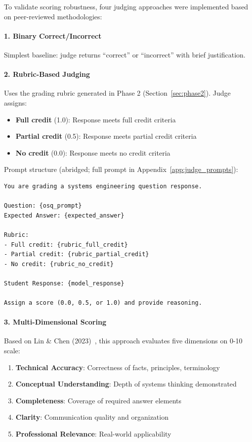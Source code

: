 To validate scoring robustness, four judging approaches were implemented based on peer-reviewed methodologies:

\paragraph{1. Binary Correct/Incorrect}
Simplest baseline: judge returns ``correct'' or ``incorrect'' with brief justification.

\paragraph{2. Rubric-Based Judging}
Uses the grading rubric generated in Phase 2 (Section~\ref{sec:phase2}). Judge assigns:
\begin{itemize}
    \item \textbf{Full credit} (1.0): Response meets full credit criteria
    \item \textbf{Partial credit} (0.5): Response meets partial credit criteria
    \item \textbf{No credit} (0.0): Response meets no credit criteria
\end{itemize}

Prompt structure (abridged; full prompt in Appendix~\ref{app:judge_prompts}):
\begin{verbatim}
You are grading a systems engineering question response.

Question: {osq_prompt}
Expected Answer: {expected_answer}

Rubric:
- Full credit: {rubric_full_credit}
- Partial credit: {rubric_partial_credit}
- No credit: {rubric_no_credit}

Student Response: {model_response}

Assign a score (0.0, 0.5, or 1.0) and provide reasoning.
\end{verbatim}

\paragraph{3. Multi-Dimensional Scoring}
Based on Lin \& Chen (2023)~\citep{lin2023multidim}, this approach evaluates five dimensions on 0-10 scale:

\begin{enumerate}
    \item \textbf{Technical Accuracy}: Correctness of facts, principles, terminology
    \item \textbf{Conceptual Understanding}: Depth of systems thinking demonstrated
    \item \textbf{Completeness}: Coverage of required answer elements
    \item \textbf{Clarity}: Communication quality and organization
    \item \textbf{Professional Relevance}: Real-world applicability
\end{enumerate}


